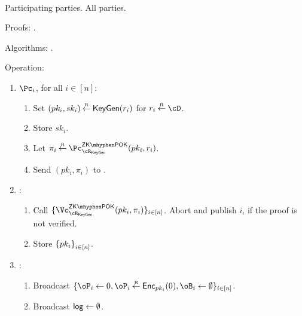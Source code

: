 \begin{protocol}~\label{prot:ConfidentialTransactions:Init}
	

	\item[Participating parties.] All parties.
			
			
	\item[Proofs:]   \piZKPOK{\rKeyGen}. 
	
	
	\item[Algorithms:]    \KeyGen.
	
			
\item[Operation:] ~
			
			
			\begin{enumerate}
				
				\item   $\Pc_i$, for  all $i\in [n]$:
				\begin{enumerate}
					\item Set $(pk_i,sk_i) \mathbin{\stackrel{\mbox{\tiny R}}{\leftarrow}} \mathsf{KeyGen}(r_i)$ for $r_i \getsr \cD$.
					
					\item Store $sk_i$.
					
					\item Let $\pi_i \getsr \pZKPOK{\rKeyGen}(pk_i,r_i)$.
					
					\item Send $(pk_i,\pi_i)$ to \Cc.
					
					
				\end{enumerate}
				
				\item \Cc:
				\begin{enumerate}
					
					\item Call $\sset{ \vZKPOK{\rKeyGen}(pk_i,\pi_i)}_{i\in [n]}$. Abort and publish $i$, if the \ith  proof is not verified. 
										
					\item Store $\set{pk_i}_{i\in [n]}$.
				\end{enumerate}
				
				
				\item \Cc: 
				\begin{enumerate}
					\item 	Broadcast $\sset{\oP_i \asn 0, \oP_i\getsr \Enc_{pk_i}(0),\oB_i\asn \emptyset}_{i\in [n]}$.
					
					\item    Broadcast $\mathsf{log} \leftarrow \emptyset$.
				\end{enumerate}								
			\end{enumerate}
\end{protocol}


